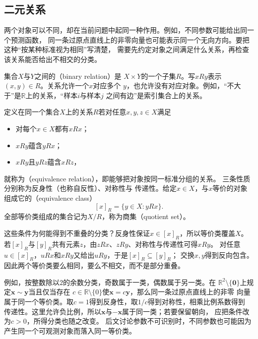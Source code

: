 \subsection{二元关系}
\label{sec:prelim-binary-relations}

两个对象可以不同，却在当前问题中起同一种作用。例如，不同参数可能给出同一个预测函数，
同一条过原点直线上的非零向量也可能表示同一个无向方向。要把这种“按某种标准视为相同”写清楚，
需要先约定对象之间满足什么关系，再检查该关系能否给出不相交的分类。

集合$X$与$Y$之间的（binary relation）是
$X\times Y$的一个子集$R$。写$xRy$表示$(x,y)\in R$。关系允许一个$x$对应多个
$y$，也允许没有对应对象。例如，“不大于”是$\mathbb{R}$上的关系，“样本$i$与样本$j$
之间有边”是索引集合上的关系。

\begin{definition}[等价关系与等价类]
\label{def:prelim-equivalence-relation}
定义在同一个集合$X$上的关系$R$若对任意$x,y,z\in X$满足
\begin{itemize}
  \item 对每个$x\in X$都有$xRx$；
  \item $xRy$蕴含$yRx$；
  \item $xRy$且$yRz$蕴含$xRz$，
\end{itemize}
就称为（equivalence relation），即能够把对象按同一标准分组的关系。
三条性质分别称为反身性（也称自反性）、对称性与
传递性。给定$x\in X$，与$x$等价的对象组成它的（equivalence class）
\[
 [x]_R=\{y\in X:yRx\}.
\]
全部等价类组成的集合记为$X/R$，称为商集（quotient set）。
\end{definition}
这些条件为何能得到不重叠的分类？反身性保证$x\in[x]_R$，所以等价类覆盖$X$。
若$[x]_R$与$[y]_R$共有元素$z$，由$zRx$、$zRy$、对称性与传递性可得$xRy$。
对任意$u\in[x]_R$，$uRx$和$xRy$又给出$uRy$，于是$[x]_R\subseteq[y]_R$；
交换$x,y$得到反向包含。因此两个等价类要么相同，要么不相交，而不是部分重叠。

例如，按整数除以$2$的余数分类，奇数属于一类，偶数属于另一类。在
$\mathbb{R}^2\setminus\{\bm{0}\}$上规定$\bm{x}\sim\bm{y}$当且仅当存在
$c\in\mathbb{R}\setminus\{0\}$使$\bm{x}=c\bm{y}$，那么同一条过原点直线上的非零
向量属于同一个等价类。取$c=1$得到反身性，取$1/c$得到对称性，相乘比例系数得到
传递性。这里允许负比例，所以$\bm{x}$与$-\bm{x}$属于同一类；若要保留朝向，
应把条件改为$c>0$，所得分类也随之改变。
后文讨论参数不可识别时，不同参数也可能因为产生同一个可观测对象而落入同一等价类。

